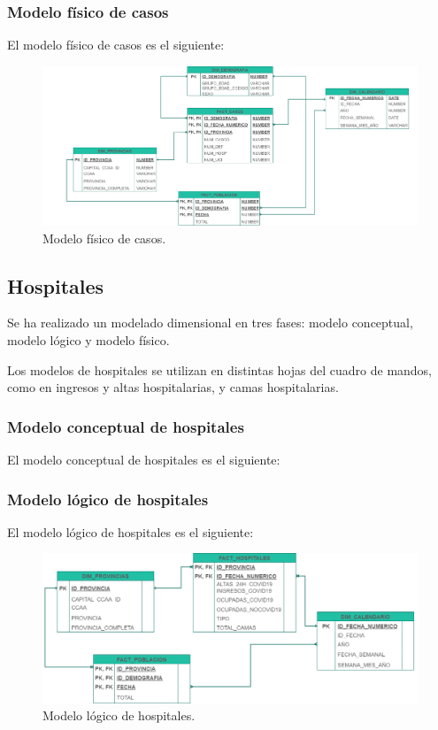 \subsubsection{Modelo físico de casos}
El modelo físico de casos es el siguiente:

\begin{figure}[h]
    \advance\leftskip-0.5cm 
    \includegraphics[scale=0.25]{img/casos_fisico.png}
    \caption{Modelo físico de casos.}
\end{figure}

\subsection{Hospitales}
Se ha realizado un modelado dimensional en tres fases: modelo conceptual, modelo lógico y modelo físico.

Los modelos de hospitales se utilizan en distintas hojas del cuadro de mandos, como en ingresos y altas hospitalarias, y camas hospitalarias.

\subsubsection{Modelo conceptual de hospitales}
El modelo conceptual de hospitales es el siguiente:


\subsubsection{Modelo lógico de hospitales}
El modelo lógico de hospitales es el siguiente:

\begin{figure}[h]
    \advance\leftskip-2cm 
    \includegraphics[scale=0.65]{img/hospitales_logico.png}
    \caption{Modelo lógico de hospitales.}
\end{figure}
\newpage

